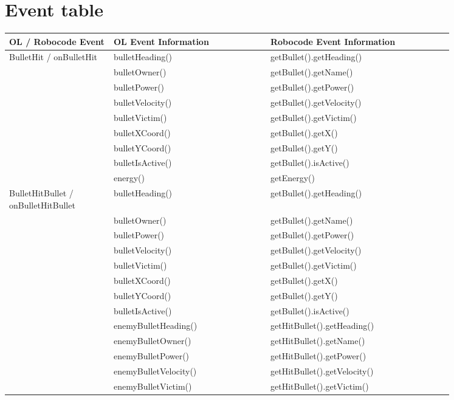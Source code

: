 \section{Event table}
\begin{center}
	\begin{tabular}{ | p{0.2\linewidth} | p{0.3\linewidth} | p{0.35\linewidth} |}
		\hline
		OL / Robocode Event& OL Event Information & Robocode Event Information \\ \hline
		BulletHit / onBulletHit& bulletHeading() & getBullet().getHeading() \\ \hline
		& bulletOwner() & getBullet().getName() \\ \hline
		& bulletPower() & getBullet().getPower() \\ \hline
		& bulletVelocity() & getBullet().getVelocity() \\ \hline
		& bulletVictim() & getBullet().getVictim() \\ \hline
		& bulletXCoord() & getBullet().getX() \\ \hline
		& bulletYCoord() & getBullet().getY() \\ \hline
		& bulletIsActive() & getBullet().isActive() \\ \hline
		& energy() & getEnergy() \\ \hline
		BulletHitBullet / onBulletHitBullet& bulletHeading() & getBullet().getHeading() \\ \hline
		& bulletOwner() & getBullet().getName() \\ \hline
		& bulletPower() & getBullet().getPower() \\ \hline
		& bulletVelocity() & getBullet().getVelocity() \\ \hline
		& bulletVictim() & getBullet().getVictim() \\ \hline
		& bulletXCoord() & getBullet().getX() \\ \hline
		& bulletYCoord() & getBullet().getY() \\ \hline
		& bulletIsActive() & getBullet().isActive() \\ \hline
		& enemyBulletHeading() & getHitBullet().getHeading() \\ \hline
		& enemyBulletOwner() & getHitBullet().getName() \\ \hline
		& enemyBulletPower() & getHitBullet().getPower() \\ \hline
		& enemyBulletVelocity() & getHitBullet().getVelocity() \\ \hline
		& enemyBulletVictim() & getHitBullet().getVictim() \\ \hline

\end{tabular}
\end{center}
